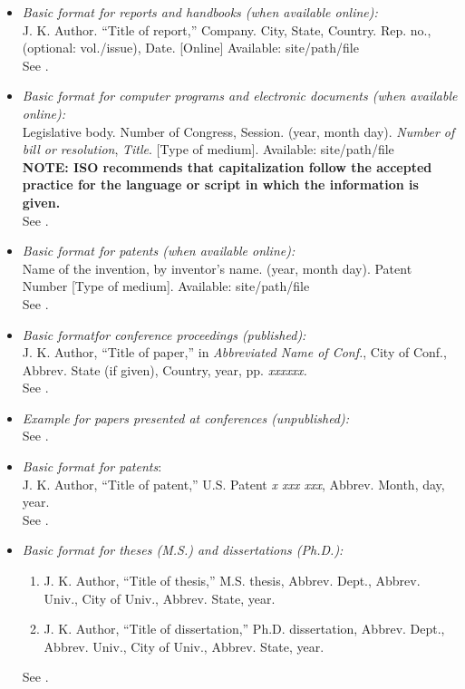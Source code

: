 \documentclass{ieeeaccess}
\begin{document}
\begin{itemize}
\item \emph{Basic format for reports and handbooks (when available online):}\\
J. K. Author. ``Title of report,'' Company. City, State, Country. Rep. no., (optional: vol./issue), Date. [Online] Available: site/path/file\\
See \cite{b18,b19}.

\item \emph{Basic format for computer programs and electronic documents (when available online): }\\
Legislative body. Number of Congress, Session. (year, month day). \emph{Number of bill or resolution}, \emph{Title}. [Type of medium]. Available: site/path/file\\
\textbf{NOTE: ISO recommends that capitalization follow the accepted practice for the language or script in which the information is given.}\\
See \cite{b20}.

\item \emph{Basic format for patents (when available online):}\\
Name of the invention, by inventor's name. (year, month day). Patent Number [Type of medium]. Available: site/path/file\\
See \cite{b21}.

\item \emph{Basic format}\emph{for conference proceedings (published):}\\
J. K. Author, ``Title of paper,'' in \emph{Abbreviated Name of Conf.}, City of Conf., Abbrev. State (if given), Country, year, pp. \emph{xxxxxx.}\\
See \cite{b22}.

\item \emph{Example for papers presented at conferences (unpublished):}\\
See \cite{b23}.

\item \emph{Basic format for patents}$:$\\
J. K. Author, ``Title of patent,'' U.S. Patent \emph{x xxx xxx}, Abbrev. Month, day, year.\\
See \cite{b24}.

\item \emph{Basic format for theses (M.S.) and dissertations (Ph.D.):}
\begin{enumerate}
\item J. K. Author, ``Title of thesis,'' M.S. thesis, Abbrev. Dept., Abbrev. Univ., City of Univ., Abbrev. State, year.
\item J. K. Author, ``Title of dissertation,'' Ph.D. dissertation, Abbrev. Dept., Abbrev. Univ., City of Univ., Abbrev. State, year.
\end{enumerate}
See \cite{b25,b26}.


\end{itemize}
\end{document}
